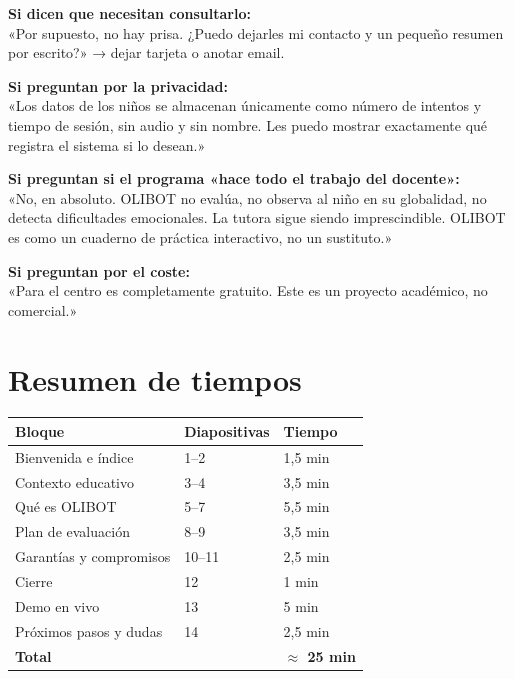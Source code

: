 \documentclass[11pt, a4paper]{article}
\begin{document}
\begin{nota}
\textbf{Si dicen que necesitan consultarlo:}\\
«Por supuesto, no hay prisa. ¿Puedo dejarles mi contacto y un pequeño
resumen por escrito?» → dejar tarjeta o anotar email.

\textbf{Si preguntan por la privacidad:}\\
«Los datos de los niños se almacenan únicamente como número de intentos
y tiempo de sesión, sin audio y sin nombre. Les puedo mostrar exactamente
qué registra el sistema si lo desean.»

\textbf{Si preguntan si el programa «hace todo el trabajo del docente»:}\\
«No, en absoluto. OLIBOT no evalúa, no observa al niño en su globalidad,
no detecta dificultades emocionales. La tutora sigue siendo imprescindible.
OLIBOT es como un cuaderno de práctica interactivo, no un sustituto.»

\textbf{Si preguntan por el coste:}\\
«Para el centro es completamente gratuito. Este es un proyecto académico,
no comercial.»
\end{nota}

\section*{Resumen de tiempos}

\vspace{8pt}
\begin{center}
\begin{tabular}{lll}
  \toprule
  \textbf{Bloque} & \textbf{Diapositivas} & \textbf{Tiempo} \\
  \midrule
  Bienvenida e índice    & 1--2  & 1,5 min \\
  Contexto educativo     & 3--4  & 3,5 min \\
  Qué es OLIBOT          & 5--7  & 5,5 min \\
  Plan de evaluación     & 8--9  & 3,5 min \\
  Garantías y compromisos & 10--11 & 2,5 min \\
  Cierre                 & 12    & 1 min   \\
  Demo en vivo           & 13    & 5 min   \\
  Próximos pasos y dudas & 14    & 2,5 min \\
  \midrule
  \textbf{Total} & & \textbf{$\approx$ 25 min} \\
  \bottomrule
\end{tabular}
\end{center}
\end{document}

